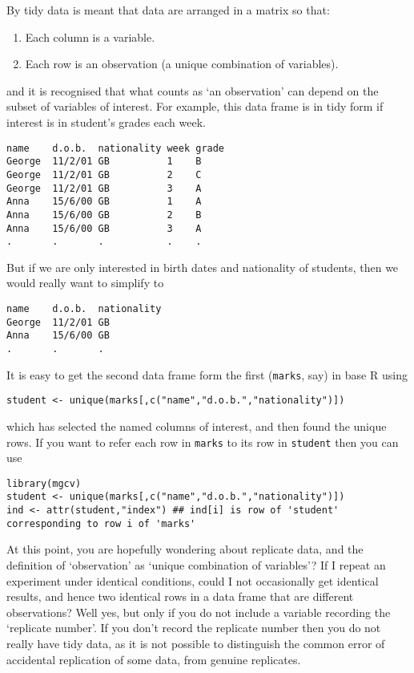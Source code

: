 \documentclass[10pt] {article}
\theoremstyle{definition}
\begin{document}
By tidy data is meant that data are arranged in a matrix so that:
\begin{enumerate}
\item Each column is a variable.
\item Each row is an observation (a unique combination of variables).
\end{enumerate}
and it is recognised that what counts as `an observation' can depend on the subset of variables of interest. For example,
this data frame is in tidy form if interest is in student's grades each week. 
\begin{verbatim}
name    d.o.b.  nationality week grade
George  11/2/01 GB          1    B
George  11/2/01 GB          2    C
George  11/2/01 GB          3    A
Anna    15/6/00 GB          1    A
Anna    15/6/00 GB          2    B
Anna    15/6/00 GB          3    A
.       .       .           .    .
\end{verbatim}
But if we are only interested in birth dates and nationality of students, then we would really want to simplify to
\begin{verbatim}
name    d.o.b.  nationality 
George  11/2/01 GB          
Anna    15/6/00 GB          
.       .       .           
\end{verbatim}
It is easy to get the second data frame form the first (\verb+marks+, say) in base R using
\begin{verbatim}
student <- unique(marks[,c("name","d.o.b.","nationality")])
\end{verbatim}
which has selected the named columns of interest, and then found the unique rows. If you want to refer each row in \verb+marks+ to its row in \verb+student+ then you can use 
\begin{verbatim}
library(mgcv)
student <- unique(marks[,c("name","d.o.b.","nationality")])
ind <- attr(student,"index") ## ind[i] is row of 'student' corresponding to row i of 'marks'
\end{verbatim}

At this point, you are hopefully wondering about replicate data, and the definition of `observation' as `unique combination of variables'? If I repeat an experiment under identical conditions, could I not occasionally get identical results, and hence two identical rows in a data frame that are different observations? Well yes, but only if you do not include a variable recording the `replicate number'. If you don't record the replicate number then you do not really have tidy data, as it is not possible to distinguish the common error of accidental replication of some data, from genuine replicates.
\end{document}
